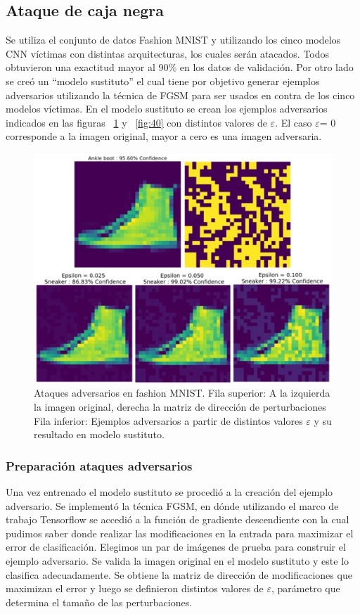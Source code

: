 \subsection{Ataque de caja negra}
Se utiliza el conjunto de datos Fashion MNIST y utilizando los cinco modelos CNN víctimas con distintas arquitecturas, los cuales serán atacados. Todos obtuvieron una exactitud mayor al 90\% en los datos de validación. Por otro lado se creó un “modelo sustituto” el cual tiene por objetivo generar ejemplos adversarios utilizando la técnica de FGSM para ser usados en contra de los cinco modelos víctimas. En el modelo sustituto se crean los ejemplos adversarios indicados en las figuras ~\ref{fig:38} y ~\ref{fig:40} con distintos valores de $\varepsilon$. El caso $\varepsilon$= 0 corresponde a la imagen original, mayor a cero es una imagen adversaria. 

\begin{figure}[!h]
\centering
\includegraphics{Figures/figura_38.PNG}
\decoRule
\caption[Ataques adversarios en fashion MNIST.]{Ataques adversarios en fashion MNIST. Fila superior: A la izquierda la imagen original, derecha la matriz de dirección de perturbaciones
Fila inferior: Ejemplos adversarios a partir de distintos valores $\varepsilon$ y su resultado en modelo sustituto.}
\label{fig:38}
\end{figure}


\subsubsection{Preparación ataques adversarios}
Una vez entrenado el modelo sustituto se procedió a la creación del ejemplo adversario. Se implementó la técnica FGSM, en dónde utilizando el marco de trabajo Tensorflow se accedió a la función de gradiente descendiente con la cual pudimos saber donde realizar las modificaciones en la entrada para maximizar el error de clasificación.
Elegimos un par de imágenes de prueba para construir el ejemplo adversario. Se valida la imagen original en el modelo sustituto y este lo clasifica adecuadamente. Se obtiene la matriz de dirección de modificaciones que maximizan el error y luego se definieron distintos valores de $\varepsilon$, parámetro que determina el tamaño de las perturbaciones. 


